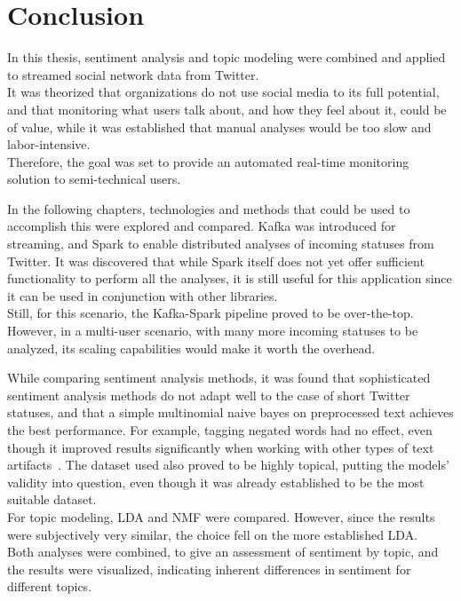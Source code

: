 \chapter{Conclusion}
\label{ch:conclusion}


In this thesis, sentiment analysis and topic modeling were combined and applied to streamed social network data from Twitter.\\
It was theorized that organizations do not use social media to its full potential,
and that monitoring what users talk about, and how they feel about it,
could be of value,
while it was established that manual analyses would be too slow and labor-intensive.\\
Therefore, the goal was set to provide an automated real-time monitoring solution to semi-technical users.

In the following chapters, technologies and methods that could be used to accomplish this were explored and compared.
Kafka was introduced for streaming, and Spark to enable distributed analyses of incoming statuses from Twitter.
It was discovered that while Spark itself does not yet offer sufficient functionality to perform all the analyses,
it is still useful for this application since it can be used in conjunction with other libraries.\\
Still, for this scenario, the Kafka-Spark pipeline proved to be over-the-top.
However, in a multi-user scenario, with many more incoming statuses to be analyzed,
its scaling capabilities would make it worth the overhead.

While comparing sentiment analysis methods, it was found that sophisticated sentiment analysis methods do not adapt well
to the case of short Twitter statuses, and that a simple multinomial naive bayes on preprocessed text achieves the
best performance.
For example, tagging negated words had no effect, even though it improved results significantly when working with
other types of text artifacts~\cite{Hoffmann2005}.
The dataset used also proved to be highly topical, putting the models' validity into question,
even though it was already established to be the most suitable dataset.\\
For topic modeling, LDA and NMF were compared.
However, since the results were subjectively very similar, the choice fell on the more established LDA.\\
Both analyses were combined, to give an assessment of sentiment by topic, and the results were visualized,
indicating inherent differences in sentiment for different topics.

